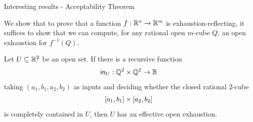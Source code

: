 \begin{frame}{Interesting results - Acceptability Theorem }
    \pause
    \begin{minipage}[t]{0.45\linewidth}
    \vspace{-2.5em}
    \begin{theorem}
        We show that to prove that a function $f:\mathbb{R}^n \to\mathbb{R}^m$ is exhaustion-reflecting, it suffices to show that we can compute, for any rational open $m$-cube $Q$, an open exhaustion for $f^{-1}(Q)$.
    \end{theorem}
    \pause
    \vspace{-1 em}
    \begin{theorem}
        Let $U \subseteq \mathbb{R}^2$ be an open set. If there is a recursive function
        \vspace{-1em}
        \[
        \vspace{-1em}
        \mathsf{in}_U:\Rationals^{2} \times \Rationals^2\to \Bools
        \] 
        taking $(a_1,b_1, a_2, b_2)$ as inputs and deciding whether the closed rational $2$-cube 
        \vspace{-1em}
        \[
        [a_1,b_1] \times [a_2, b_2]
        \vspace{-1em}
        \]
        is completely contained in $U$, then $U$ has an effective open exhaustion.
    \end{theorem}


\end{minipage}
\end{frame}
